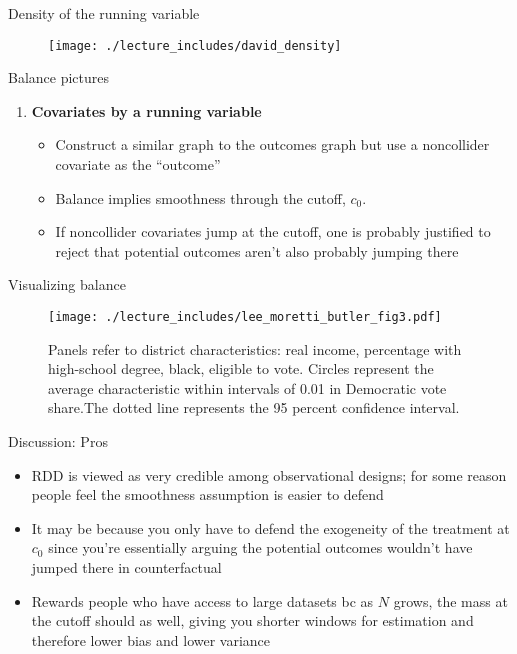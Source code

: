 \documentclass{beamer}
\begin{document}
\begin{frame}{Density of the running variable}
	
	\begin{figure}
	\texttt{[image: ./lecture\_includes/david\_density]}
	\end{figure}
	
\end{frame}

\begin{frame}{Balance pictures}

\begin{enumerate}\addtocounter{enumi}{3}
	\item \textbf{Covariates by a running variable}
		\begin{itemize}
		\item Construct a similar graph to the outcomes graph but use a noncollider covariate as the ``outcome''
		\item Balance implies smoothness through the cutoff, $c_0$.  
		\item If noncollider covariates jump at the cutoff, one is probably justified to reject that potential outcomes aren't also probably jumping there
		\end{itemize}
	\end{enumerate}
\end{frame}

\begin{frame}{Visualizing balance}
	\begin{figure}
	\texttt{[image: ./lecture\_includes/lee\_moretti\_butler\_fig3.pdf]}
	\caption{\scriptsize Panels refer to district characteristics: real income, percentage with high-school degree, black, eligible to vote. Circles represent the average characteristic within intervals of 0.01 in Democratic vote share.The dotted line represents the 95 percent confidence interval.}
	\end{figure}
	
\end{frame}






\begin{frame}{Discussion: Pros}

\begin{itemize}
\item RDD is viewed as very credible among observational designs; for some reason people feel the smoothness assumption is easier to defend
\item It may be because you only have to defend the exogeneity of the treatment at $c_0$ since you're essentially arguing the potential outcomes wouldn't have jumped there in counterfactual
\item Rewards people who have access to large datasets bc as $N$ grows, the mass at the cutoff should as well, giving you shorter windows for estimation and therefore lower bias and lower variance
\end{itemize}

\end{frame}
\end{document}
